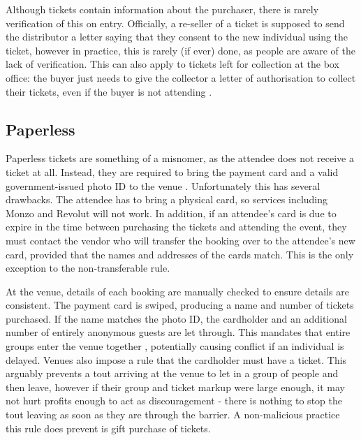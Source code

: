 \documentclass[12pt]{bhamdissertation}
\begin{document}
Although tickets contain information about the purchaser, there is rarely verification of this on entry. Officially, a re-seller of a ticket is supposed to send the distributor a letter saying that they consent to the new individual using the ticket, however in practice, this is rarely (if ever) done, as people are aware of the lack of verification. This can also apply to tickets left for collection at the box office: the buyer just needs to give the collector a letter of authorisation to collect their tickets, even if the buyer is not attending \autocite{S16}.

\subsection{Paperless}

Paperless tickets are something of a misnomer, as the attendee does not receive a ticket at all. Instead, they are required to bring the payment card and a valid government-issued photo ID to the venue \autocite{T165}. Unfortunately this has several drawbacks. The attendee has to bring a physical card, so services including Monzo and Revolut will not work. In addition, if an attendee's card is due to expire in the time between purchasing the tickets and attending the event, they must contact the vendor who will transfer the booking over to the attendee's new card, provided that the names and addresses of the cards match. This is the only exception to the non-transferable rule.

At the venue, details of each booking are manually checked to ensure details are consistent. The payment card is swiped, producing a name and number of tickets purchased. If the name matches the photo ID, the cardholder and an additional number of entirely anonymous guests are let through. This mandates that entire groups enter the venue together \autocite{T166}, potentially causing conflict if an individual is delayed. Venues also impose a rule that the cardholder must have a ticket. This arguably prevents a tout arriving at the venue to let in a group of people and then leave, however if their group and ticket markup were large enough, it may not hurt profits enough to act as discouragement - there is nothing to stop the tout leaving as soon as they are through the barrier. A non-malicious practice this rule does prevent is gift purchase of tickets.
\end{document}
